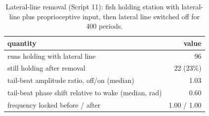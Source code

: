 \begin{table}
\caption{Lateral-line removal (Script 11): fish holding station with lateral-line plus proprioceptive input, then lateral line switched off for 400 periods.}
\label{tab:T7_lateral_line}
\begin{ruledtabular}
\begin{tabular}{lr}
quantity & value \\
\hline
runs holding with lateral line & 96 \\
still holding after removal & 22 (23\%) \\
tail-beat amplitude ratio, off/on (median) & 1.03 \\
tail-beat phase shift relative to wake (median, rad) & 0.60 \\
frequency locked before / after & 1.00 / 1.00 \\
\end{tabular}
\end{ruledtabular}
\end{table}